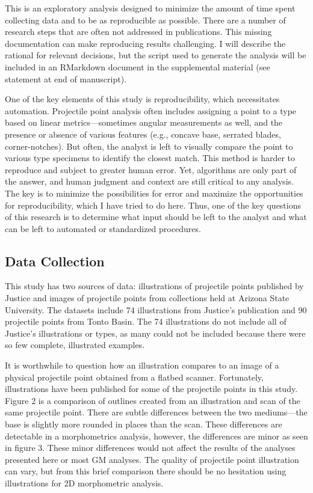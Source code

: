 \documentclass[PCJ,Unicode,screen,mode=plain]{cedram}
\begin{document}
This is an exploratory analysis designed to minimize the amount of time spent collecting data and to be as reproducible as possible. There are a number of research steps that are often not addressed in publications. This missing documentation can make reproducing results challenging. I will describe the rational for relevant decisions, but the script used to generate the analysis will be included in an RMarkdown document in the supplemental material (see statement at end of manuscript).

One of the key elements of this study is reproducibility, which necessitates automation. Projectile point analysis often includes assigning a point to a type based on linear metrics---sometimes angular measurements as well, and the presence or absence of various features (e.g., concave base, serrated blades, corner-notches). But often, the analyst is left to visually compare the point to various type specimens to identify the closest match. This method is harder to reproduce and subject to greater human error. Yet, algorithms are only part of the answer, and human judgment and context are still critical to any analysis. The key is to minimize the possibilities for error and maximize the opportunities for reproducibility, which I have tried to do here. Thus, one of the key questions of this research is to determine what input should be left to the analyst and what can be left to automated or standardized procedures.

\subsection{Data Collection}

This study has two sources of data: illustrations of projectile points published by Justice \autocite*{Justice2002-cf} and images of projectile points from collections held at Arizona State University. The datasets include 74 illustrations from Justice's publication and 90 projectile points from Tonto Basin. The 74 illustrations do not include all of Justice's illustrations or types, as many could not be included because there were so few complete, illustrated examples.

It is worthwhile to question how an illustration compares to an image of a physical projectile point obtained from a flatbed scanner. Fortunately, illustrations have been published for some of the projectile points in this study. Figure 2 is a comparison of outlines created from an illustration and scan of the same projectile point. There are subtle differences between the two mediums---the base is slightly more rounded in places than the scan. These differences are detectable in a morphometrics analysis, however, the differences are minor as seen in figure 3. These minor differences would not affect the results of the analyses presented here or most GM analyses. The quality of projectile point illustration can vary, but from this brief comparison there should be no hesitation using illustrations for 2D morphometric analysis.
\end{document}
